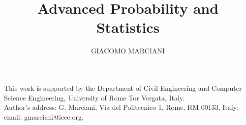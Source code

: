\documentclass[prodmode,gmlecture]{acmlarge}
\title{Advanced Probability and Statistics}
\author{GIACOMO MARCIANI \affil{University of Rome Tor Vergata}}
\numberwithin{equation}{section}
\begin{document}
\begin{bottomstuff}
	This work is supported by the Department of Civil Engineering and Computer Science
	Engineering, University of Rome Tor Vergata, Italy.\\
	Author's address: G. Marciani, Via del Politecnico 1, Rome, RM 00133, Italy;
	email: gmarciani@ieee.org.
\end{bottomstuff}

\maketitle










\end{document}
